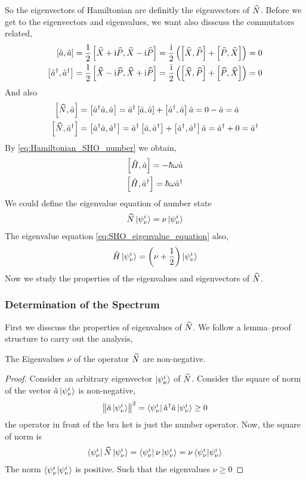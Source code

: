 So the eigenvectors of Hamiltonian are definitly the eigenvectors of $\widehat{N}$. Before we get to the eigenvectors and eigenvalues, we want also disscuss the commutators related, 
\begin{align}
    \left[ \hat{a} , \hat{a} \right] = \frac{1}{2} \left[ \widehat{X} + \mathrm{i} \widehat{P} , \widehat{X} - \mathrm{i} \widehat{P} \right] = \frac{\mathrm{i}}{2} \left(\left[ \widehat{X} , \widehat{P} \right] + \left[ \widehat{P} , \widehat{X} \right]\right) = 0 \\
    \left[ \hat{a}^ \dag , \hat{a}^ \dag \right] = \frac{1}{2} \left[ \widehat{X} - \mathrm{i} \widehat{P} , \widehat{X} + \mathrm{i} \widehat{P} \right] = \frac{\mathrm{i}}{2} \left(\left[ \widehat{X} , \widehat{P} \right] + \left[ \widehat{P} , \widehat{X} \right]\right) = 0
\end{align}
And also 
\begin{align}
    \left[ \widehat{N} , \hat{a} \right] &= \left[ \hat{a}^ \dag \hat{a} , \hat{a} \right] = \hat{a}^ \dag \left[ \hat{a} , \hat{a} \right] + \left[ \hat{a}^ \dag , \hat{a} \right] \hat{a} = 0 - \hat{a} = \hat{a} \\
    \left[ \widehat{N} , \hat{a}^ \dag \right] &= \left[ \hat{a}^ \dag \hat{a} , \hat{a}^ \dag \right] = \hat{a}^ \dag \left[ \hat{a} , \hat{a}^ \dag \right] + \left[ \hat{a}^ \dag , \hat{a}^ \dag \right] \hat{a} = \hat{a}^ \dag + 0 = \hat{a}^ \dag
\end{align}
By \cref{eq:Hamiltonian_SHO_number} we obtain, 
\begin{align}
    \left[ \hat{H} , \hat{a} \right] = - \hbar \omega \hat{a} \\
    \left[ \hat{H} , \hat{a}^ \dag \right] = \hbar \omega \hat{a}^ \dag
\end{align}
We could define the eigenvalue equation of number state 
\begin{eqnarray}
    \widehat{N} \ket{\psi_ \nu^ i} =  \nu\ket{\psi_ \nu^i}
\end{eqnarray}
The eigenvalue equation \cref{eq:SHO_eigenvalue_equation} also, 
\begin{eqnarray}
    \hat{H} \ket{\psi_ \nu ^i} = \left( \nu + \frac{1}{2}\right) \ket{\psi_ \nu^i} 
\end{eqnarray}
Now we study the properties of the eigenvalues and eigenvectors of $\widehat{N}$.
\subsubsection{Determination of the Spectrum}
First we disscuss the properties of eigenvalues of $\widehat{N}$. We follow a lemma–proof structure to carry out the analysis,
\begin{lemma} \label{lemma:SHO_eigenvalue_nonnegative}
    The Eigenvalues $ \nu$ of the operator $\widehat{N}$ are non-negative.
\end{lemma}
\begin{proof}
    Consider an arbitrary eigenvector $\ket{\psi_ \nu^i}$ of $\widehat{N}$. Consider the square of norm of the vector $\hat{a} \ket{\psi_ \nu^i}$ is non-negative,
    \begin{eqnarray}
        \left\lVert \hat{a} \ket{\psi_ \nu^i} \right\rVert^2 = \bra{\psi_ \nu^i} \hat{a}^ \dag \hat{a} \ket{\psi_ \nu^i} \geq 0
    \end{eqnarray}
    the operator in front of the bra ket is just the number operator. Now, the square of norm is
    \begin{eqnarray}
        \bra{\psi_ \nu^i} \widehat{N} \ket{\psi_ \nu^i} = \bra{\psi_ \nu^i} \nu \ket{\psi_ \nu^i} = \nu \braket{\psi_ \nu^i|\psi_ \nu^i} \label{eq:SHO_eigenvalue_norm}
    \end{eqnarray}
    The norm $\braket{\psi_ \nu^i|\psi_ \nu^i}$ is positive. Such that the eigenvalues $\nu \geq 0$
\end{proof}

